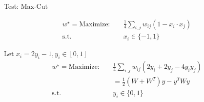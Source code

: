 \begin{frame}{Test: Max-Cut}

  \[\begin{aligned}
      w^\star = \mathrm{Maximize: } \quad & \frac{1}{4} \sum_{i,j} w_{ij}(1-x_i\cdot x_j) \\
      \mathrm{s.t. }       \quad          & x_i \in \{-1, 1\}
    \end{aligned}
  \]

  Let \(x_i = 2y_i-1, y_i \in [0, 1]\)
  \[\begin{aligned}
      w^\star  = \mathrm{Maximize: } \quad & \frac{1}{4} \sum_{i,j} w_{ij}(2y_i + 2y_j - 4y_iy_j) \\
                                           & =        \frac{1}{2} (W+W^T)y - y^TWy                \\
      \mathrm{s.t. }       \quad           & y_i \in \{0, 1\}
    \end{aligned}
  \]

\end{frame}

